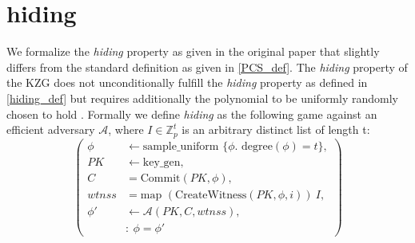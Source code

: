 \section{hiding}
We formalize the \textit{hiding} property as given in the original paper \parencite{KZG} that slightly differs from the standard definition as given in \ref{PCS_def}. 
The \textit{hiding} property of the KZG does not unconditionally fulfill the \textit{hiding} property as defined in \ref{hiding_def} but requires additionally the polynomial to be uniformly randomly chosen to hold \parencite{KZG}. Formally we define \textit{hiding} as the following game against an efficient adversary $\mathcal{A}$, where $I\in\mathbb{Z}_p^t$ is an arbitrary distinct list of length t:
\begin{equation*}
    \left(
        \begin{aligned}
            \phi & \leftarrow \text{sample\_uniform } \{\phi. \text{ degree}(\phi)=t\},\\
            PK & \leftarrow \text{key\_gen}, \\
            C & = \text{Commit}(PK,\phi), \\
            wtnss &= \text{map } (\text{CreateWitness}(PK,\phi,i))\ I,\\
            \phi' & \leftarrow \mathcal{A}(PK,C,wtnss), \\
            & : \ \phi = \phi'
        \end{aligned}
    \right)
\end{equation*}

